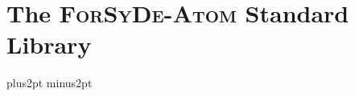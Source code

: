 \documentclass{book}
\begin{document}
\chapter{The \textsc{ForSyDe-Atom} Standard Library}
\label{ch:forsyde-atom}

\begin{refsection}
  \parskip=10pt plus2pt minus2pt
  \setlength{\parindent}{0cm}

  \begin{summary}
    
  \end{summary}
  \minitoc
  
  
  
  
  
  
  
  
  
  
  
  
  
  
  
  
  
  \printbibliography[heading=subbibliography]
  \printindex
\end{refsection}
\end{document}
